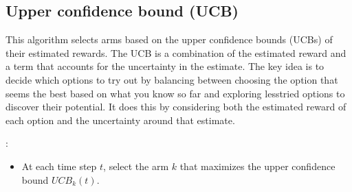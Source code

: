 \documentclass[letterpaper,10pt,english]{jupyterBook}
\begin{document}
\subsection{Upper confidence bound (UCB)}
\label{\detokenize{notebooks/bandits:upper-confidence-bound-ucb}}
\sphinxAtStartPar
This algorithm selects arms based on the upper confidence bounds (UCBs) of their estimated rewards. The UCB is a combination of the estimated reward and a term that accounts for the uncertainty in the estimate. The key idea is to decide which options to try out by balancing between choosing the option that seems the best based on what you know so far and exploring less\sphinxhyphen{}tried options to discover their potential. It does this by considering both the estimated reward of each option and the uncertainty around that estimate.

\sphinxAtStartPar
{}:
\begin{itemize}
\item {} 
\sphinxAtStartPar
At each time step \(t\), select the arm \(k\) that maximizes the upper confidence bound \(UCB_k(t)\).

\end{itemize}
\end{document}
